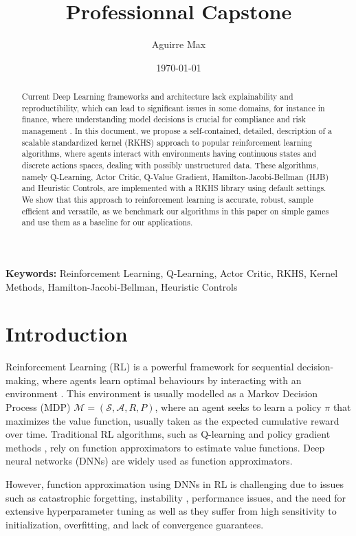 \documentclass[
]{article}
\date{\vspace{-2.5em}}
\title{\textbf{Professionnal Capstone}}
\author[1]{Aguirre Max}
\affil[1]{PSTB, Paris, France}
\date{\today} %
\numberwithin{equation}{section}
\begin{document}
\maketitle %

\begin{abstract}
Current Deep Learning frameworks and architecture lack explainability and reproductibility, which can lead to significant issues in some domains, for instance in finance, where understanding model decisions is crucial for compliance and risk management \cite{??}. In this document, we propose a self-contained, detailed, description of a scalable standardized kernel (RKHS) approach to popular reinforcement learning algorithms, where agents interact with environments having continuous states and discrete actions spaces, dealing with possibly unstructured data. These algorithms, namely Q-Learning, Actor Critic, Q-Value Gradient, Hamilton-Jacobi-Bellman (HJB) and Heuristic Controls, are implemented with a RKHS library \cite{codpy} using default settings. We show that this approach to reinforcement learning is accurate, robust, sample efficient and versatile, as we benchmark our algorithms in this paper on simple games and use them as a baseline for our applications.
\end{abstract}

\noindent\textbf{Keywords:} Reinforcement Learning, Q-Learning, Actor Critic, RKHS, Kernel Methods, Hamilton-Jacobi-Bellman, Heuristic Controls

\hypertarget{Introduction}{%
\section{Introduction}\label{Introduction}}

Reinforcement Learning (RL) is a powerful framework for sequential decision-making, where agents learn optimal behaviours by interacting with an environment \cite{sutton2018}. This environment is usually modelled as a Markov Decision Process (MDP) $\mathcal{M} = (\mathcal{S}, \mathcal{A}, R, P)$, where an agent seeks to learn a policy 
$\pi$ that maximizes the value function, usually taken as the expected cumulative reward over time. Traditional RL algorithms, such as Q-learning \cite{watkins1992} and policy gradient methods \cite{silver2014}, rely on function approximators to estimate value functions. Deep neural networks (DNNs) are widely used as function approximators.  

However, function approximation using DNNs in RL is challenging due to issues such as catastrophic forgetting, instability \cite{vanhasselt2016}, performance issues, and the need for extensive hyperparameter tuning \cite{mnih2015} as well as they suffer from high sensitivity to initialization, overfitting, and lack of convergence guarantees.
\end{document}
